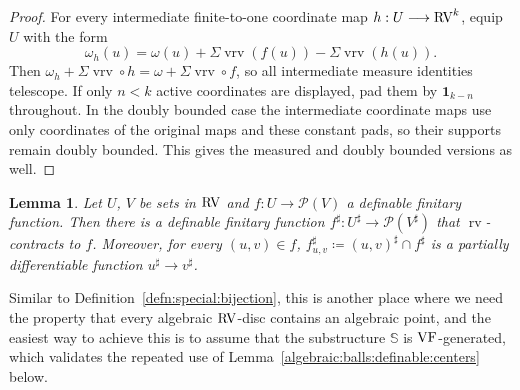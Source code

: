 \documentclass[12pt]{amsart}
\theoremstyle{plain}
\newtheorem{lem}[thm]{Lemma}
\theoremstyle{definition}
\theoremstyle{remark}
\numberwithin{equation}{section}
\theoremstyle{plain}
\newcommand{\VF}{\textup{VF}}
\newcommand{\RV}{\textup{RV}}
\newcommand{\0}{\emptyset}
\newcommand{\mdl}[1]{\mathcal{#1}}  %
\newcommand{\bb}[1]{\mathbb{#1}}
\newcommand{\fun}{\longrightarrow}
\DeclareMathOperator{\rv}{rv}
\DeclareMathOperator{\vrv}{vrv}
\begin{document}
\begin{proof}
For every intermediate finite-to-one coordinate map $h:U\fun\RV^k$, equip $U$ with the form
\[
\omega_h(u)=\omega(u)+\Sigma\vrv(f(u))-\Sigma\vrv(h(u)).
\]
Then $\omega_h+\Sigma\vrv\circ h=\omega+\Sigma\vrv\circ f$, so all intermediate measure identities telescope. If only $n<k$ active coordinates are displayed, pad them by $\mathbf1_{k-n}$ throughout. In the doubly bounded case the intermediate coordinate maps use only coordinates of the original maps and these constant pads, so their supports remain doubly bounded. This gives the measured and doubly bounded versions as well.
\end{proof}


\begin{lem}\label{RVlift}
Let $U$, $V$ be sets in $\RV$ and $f : U \fun \mdl P(V)$ a definable finitary function. Then there is a definable finitary function $f^\sharp : U^\sharp \fun \mdl P(V^\sharp)$ that $\rv$-contracts to $f$. Moreover, for every $(u, v) \in f$, $f^\sharp_{u, v} \coloneqq (u, v)^\sharp \cap f^\sharp$ is a partially differentiable function $u^\sharp \fun v^\sharp$.
\end{lem}

Similar to Definition~\ref{defn:special:bijection}, this is another place where we need the property that every algebraic $\RV$-disc contains an algebraic point, and the easiest way to achieve
this is to assume that the substructure $\bb S$ is $\VF$-generated, which validates the repeated use of Lemma~\ref{algebraic:balls:definable:centers} below.
\end{document}
